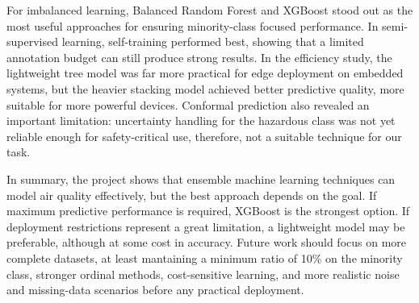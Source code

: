 \documentclass[a4paper,12pt]{article}
\begin{document}
	For imbalanced learning, Balanced Random Forest and XGBoost stood out as the most useful approaches for ensuring minority-class focused performance. In semi-supervised learning, self-training performed best, showing that a limited annotation budget can still produce strong results. In the efficiency study, the lightweight tree model was far more practical for edge deployment on embedded systems, but the heavier stacking model achieved better predictive quality, more suitable for more powerful devices. Conformal prediction also revealed an important limitation: uncertainty handling for the hazardous class was not yet reliable enough for safety-critical use, therefore, not a suitable technique for our task.
	
	In summary, the project shows that ensemble machine learning techniques can model air quality effectively, but the best approach depends on the goal. If maximum predictive performance is required, XGBoost is the strongest option. If deployment restrictions represent a great limitation, a lightweight model may be preferable, although at some cost in accuracy. Future work should focus on more complete datasets, at least mantaining a minimum ratio of 10\% on the minority class, stronger ordinal methods, cost-sensitive learning, and more realistic noise and missing-data scenarios before any practical deployment.
	
\end{document}
